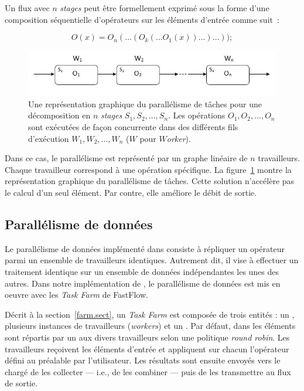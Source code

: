 Un flux avec $n$ \emph{stages} peut \^etre formellement exprim\'e sous la forme d'une composition s\'equentielle d'op\'erateurs sur les \'el\'ements d'entr\'ee comme suit~: 

\[
	O(x) = O_n( \ldots (O_k( \ldots O_1(x)) \ldots ) \ldots ));
\]


\begin{figure}[ht]
\centering
     \includegraphics[width=1.0\textwidth]{Figures/ParallelismeDuFlux.jpg}
      \caption[Une repr\'esentation graphique du parall\'elisme de t\^aches.]{Une repr\'esentation graphique du parall\'elisme de t\^aches pour une d\'ecomposition en $n$ \emph{stages} $S_1, S_2, \ldots, S_n$. Les op\'erations $O_1, O_2, \ldots, O_n$ sont ex\'ecut\'ees de fa\c{c}on concurrente dans des diff\'erents fils d'ex\'ecution $W_1, W_2, \ldots, W_n$ ($W$ pour \emph{$W$orker}).}
       \label{ParallelismeDuFlux.fig}
\end{figure}


Dans ce cas, le parall\'elisme est repr\'esent\'e par un graphe lin\'eaire de $n$ travailleurs. Chaque travailleur correspond \`a une op\'eration sp\'ecifique. La figure~\ref{ParallelismeDuFlux.fig} montre la repr\'esentation graphique du parall\'elisme de t\^aches. Cette solution n'acc\'el\`ere pas le calcul d'un seul \'el\'ement. Par contre, elle am\'eliore le d\'ebit de sortie.

\subsection{Parall\'elisme de donn\'ees}

Le parall\'elisme de donn\'ees impl\'ement\'e dans   consiste \`a r\'epliquer un op\'erateur parmi un ensemble de travailleurs identiques. Autrement dit, il vise \`a effectuer un traitement identique sur un ensemble de donn\'ees ind\'ependantes les unes des autres. 
%
Dans notre impl\'ementation de \PpFf, le parall\'elisme de donn\'ees est mis en oeuvre avec les \emph{Task Farm} de FastFlow.


D\'ecrit \`a la section~\ref{farm.sect}, un \emph{Task Farm} est compos\'ee de trois entit\'es : un , plusieurs instances de travailleurs (\emph{workers}) et un . Par d\'efaut, dans \PpFf{} les \'el\'ements sont r\'epartis par un  aux divers travailleurs selon une politique \emph{round robin}. Les travailleurs re\c{c}oivent les \'el\'ements d'entr\'ee et appliquent sur chacun l'op\'erateur d\'efini au pr\'ealable par l'utilisateur. Les r\'esultats sont ensuite envoy\'es vers le  charg\'e de les collecter --- i.e., de les combiner --- puis de les transmettre au flux de sortie.

